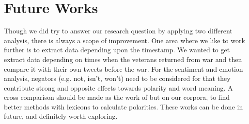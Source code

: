 \section{Future Works}

Though we did try to answer our research question by applying two different analysis, there is always a scope of improvement. One area where we like to work further is to extract data depending upon the timestamp. We wanted to get extract data depending on times when the veterans returned from war and then compare it with their own tweets before the war. For the sentiment and emotion analysis, negators (e.g. not, isn't, won't) need to be considered for that they contribute strong and opposite effects towards polarity and word meaning. A cross comparison should be made as the work of \cite{emoIntenT} but on our corpora, to find better methods with lexicons to calculate polarities. These works can be done in future, and definitely worth exploring.
